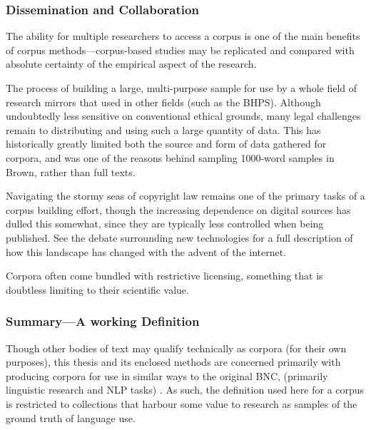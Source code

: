 





\subsubsection{Dissemination and Collaboration}
The ability for multiple researchers to access a corpus is one of the main benefits of corpus methods---corpus-based studies may be replicated and compared with absolute certainty of the empirical aspect of the research.  

The process of building a large, multi-purpose sample for use by a whole field of research mirrors that used in other fields (such as the BHPS). %
Although undoubtedly less sensitive on conventional ethical grounds, many legal challenges remain to distributing and using such a large quantity of data.  This has historically greatly limited both the source and form of data gathered for corpora, and was one of the reasons behind sampling 1000-word samples in Brown, rather than full texts.

Navigating the stormy seas of copyright law remains one of the primary tasks of a corpus building effort, though the increasing dependence on digital sources has dulled this somewhat, since they are typically less controlled when being published.  See the debate surrounding new technologies for a full description of how this landscape has changed with the advent of the internet.

Corpora often come bundled with restrictive licensing, something that is doubtless limiting to their scientific value.  %



\subsubsection{Summary---A working Definition}
Though other bodies of text may qualify technically as corpora (for their own purposes), this thesis and its enclosed methods are concerned primarily with producing corpora for use in similar ways to the original BNC, (primarily linguistic research and NLP tasks) %
.  As such, the definition used here for a corpus is restricted to collections that harbour some value to research as samples of the ground truth of language use.

